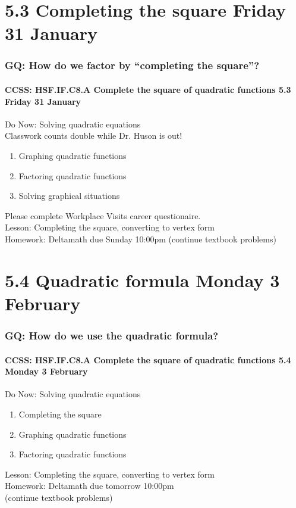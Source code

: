 \documentclass{beamer}
\begin{document}
\section{5.3 Completing the square \hfill Friday 31 January}
\frame
{
  \frametitle{GQ: How do we factor by ``completing the square''?}
  \framesubtitle{CCSS: HSF.IF.C8.A Complete the square of quadratic functions \hfill \alert{5.3 Friday 31 January}}

  \begin{block}{Do Now: Solving quadratic equations\\[0.25cm]
    \alert{Classwork counts double while Dr. Huson is out!}}
    \begin{enumerate}
      \item Graphing quadratic functions
      \item Factoring quadratic functions
      \item Solving graphical situations
    \end{enumerate}
    \end{block}
    Please complete Workplace Visits career questionaire. \\ \smallskip
    Lesson: Completing the square, converting to vertex form\\ \smallskip
    Homework: Deltamath due Sunday 10:00pm (continue textbook problems)
    }

\section{5.4 Quadratic formula \hfill Monday 3 February}
\frame
{
  \frametitle{GQ: How do we use the quadratic formula?}
  \framesubtitle{CCSS: HSF.IF.C8.A Complete the square of quadratic functions \hfill \alert{5.4 Monday 3 February}}

  \begin{block}{Do Now: Solving quadratic equations}
    \begin{enumerate}
      \item Completing the square
      \item Graphing quadratic functions
      \item Factoring quadratic functions
    \end{enumerate}
    \end{block}
    Lesson: Completing the square, converting to vertex form\\ \smallskip
    Homework: Deltamath due tomorrow 10:00pm \\ \quad (continue textbook problems)
    }
\end{document}

